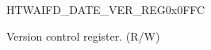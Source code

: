 \begin{register}{H}{TWAIFD\_DATE\_VER\_REG}{0x0FFC}\label{regdesc:TWAIFDDATEVERREG}
%
\regnewline%
\begin{regdesc}\begin{reglist}
\label{fielddesc:TWAIFDDATEVER}\item [TWAIFD\_DATE\_VER] Version control register. (R/W)
\end{reglist}\end{regdesc}
\end{register}
